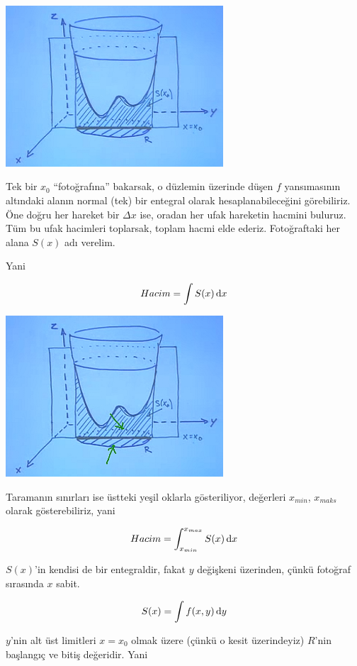 \documentclass[12pt,fleqn]{article}\usepackage{../../common}
\begin{document}
\begin{center}
\includegraphics[height=6cm]{16_5.png}
\end{center}

Tek bir $x_0$ ``fotoğrafına'' bakarsak, o düzlemin üzerinde düşen $f$
yansımasının altındaki alanın normal (tek) bir entegral olarak
hesaplanabileceğini görebiliriz. Öne doğru her hareket bir $\Delta x$ ise,
oradan her ufak hareketin hacmini buluruz. Tüm bu ufak hacimleri toplarsak,
toplam hacmi elde ederiz. Fotoğraftaki her alana $S(x)$ adı verelim.

Yani 

$$ Hacim = \int S(x) \,\mathrm{d} x $$
\begin{center}
\includegraphics[height=6cm]{16_6.png}
\end{center}

Taramanın sınırları ise üstteki yeşil oklarla gösteriliyor, değerleri $x_{min}$,
$x_{maks}$ olarak gösterebiliriz, yani

$$ Hacim = \int_{x_{min}}^{x_{max}} S(x) \,\mathrm{d} x $$

$S(x)$'in kendisi de bir entegraldir, fakat $y$ değişkeni üzerinden, çünkü
fotoğraf sırasında $x$ sabit. 

$$ S(x) = \int f(x,y) \,\mathrm{d} y $$

$y$'nin alt üst limitleri $x=x_0$ olmak üzere (çünkü o kesit üzerindeyiz)
$R$'nin başlangıç ve bitiş değeridir. Yani
\end{document}
